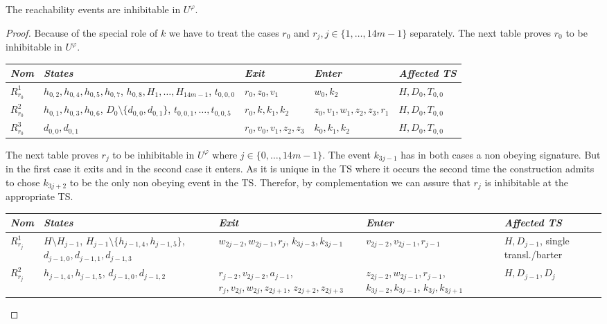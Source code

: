 \documentclass[english]{lipics_hacked}
\begin{document}
\begin{lemma}
\label{lemma:reachability}
The reachability events are inhibitable in $U^\varphi$.
\end{lemma}
%
\begin{proof}
Because of the special role of $k$ we have to treat the cases $r_0$ and $r_j,j\in \{1,\dots,14m-1\}$ separately.
The next table proves $r_0$ to be inhibitable in $U^\varphi$.
%
\begin{longtable}{p{0.7cm} p{3cm}   p{2.5cm}    p{2.5cm}      p{2.7cm}  }
\textit{Nom} &\textit{States} & \textit{Exit} & \textit{Enter} & \textit{Affected TS}  \\ \hline
$R_{r_0}^1$ &  $h_{0,2},h_{0,4},h_{0,5},h_{0,7}$, $h_{0,8},H_1,\ldots,H_{14m-1}$, $t_{0,0,0}$ & $r_0,z_0,v_1$ & $w_0,k_2$ & $H,D_0,T_{0,0}$ \\
 $R_{r_0}^2$& $h_{0,1}, h_{0,3}, h_{0,6}$, $D_0\setminus\{d_{0,0},d_{0,1}\}$, $t_{0,0,1},\ldots,t_{0,0,5}$ & $r_0,k,k_1,k_2$ & $z_0,v_1,w_1,z_2,z_3,r_1$ & $H,D_0,T_{0,0}$ \\	
 $R_{r_0}^3$ & $d_{0,0},d_{0,1}$&  $r_0,v_0,v_1,z_2,z_3$ & $k_0,k_1,k_2$ & $H,D_0,T_{0,0}$\\							
\end{longtable}
%
The next table proves $r_j$ to be inhibitable in $U^\varphi$ where $j\in \{0,\dots,14m-1\}$.
The event $k_{3j-1}$ has in both cases a non obeying signature.
But in the first case it exits and in the second case it enters. 
As it is unique in the TS where it occurs the second time the construction admits to chose $k_{3j+2}$ to be the only non obeying event in the TS.
Therefor, by complementation we can assure that $r_j$ is inhibitable at the appropriate TS.
%
\begin{longtable}{p{0.7cm} p{3cm}   p{2.5cm}    p{2.5cm}      p{2.7cm}  }
\textit{Nom} &\textit{States} & \textit{Exit} & \textit{Enter} & \textit{Affected TS}  \\ \hline
$R_{r_j}^1$ & $H\setminus H_{j-1}$, $H_{j-1}\setminus\{h_{j-1,4},h_{j-1,5}\}$, $d_{j-1,0},d_{j-1,1},d_{j-1,3}$ & $w_{2j-2},w_{2j-1},r_j$, $k_{3j-3},k_{3j-1}$ & $v_{2j-2},v_{2j-1},r_{j-1} $ & $H,D_{j-1}$, single transl./barter \\
 $R_{r_j}^2$& $h_{j-1,4},h_{j-1,5}$, $d_{j-1,0},d_{j-1,2}$ & $r_{j-2},v_{2j-2},a_{j-1}$, $r_j,v_{2j}, w_{2j}, z_{2j+1}$, $z_{2j+2},z_{2j+3}$ & $ z_{2j-2},w_{2j-1},r_{j-1}$, $k_{3j-2},k_{3j-1}$, $k_{3j},k_{3j+1}$ & $H,D_{j-1},D_j$						
\end{longtable}
\end{proof}
\end{document}
